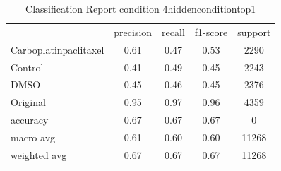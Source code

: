 \begin{table}[htbp]
\centering
\caption{Classification Report condition 4hiddenconditiontop1}
\label{tab:classificationreport.condition.4hiddenconditiontop1}
\begin{tabular}{lcccc}
 & precision & recall & f1-score & support \\
Carboplatinpaclitaxel & 0.61 & 0.47 & 0.53 & 2290 \\
Control & 0.41 & 0.49 & 0.45 & 2243 \\
DMSO & 0.45 & 0.46 & 0.45 & 2376 \\
Original & 0.95 & 0.97 & 0.96 & 4359 \\
accuracy & 0.67 & 0.67 & 0.67 & 0 \\
macro avg & 0.61 & 0.60 & 0.60 & 11268 \\
weighted avg & 0.67 & 0.67 & 0.67 & 11268 \\
\end{tabular}
\end{table}
